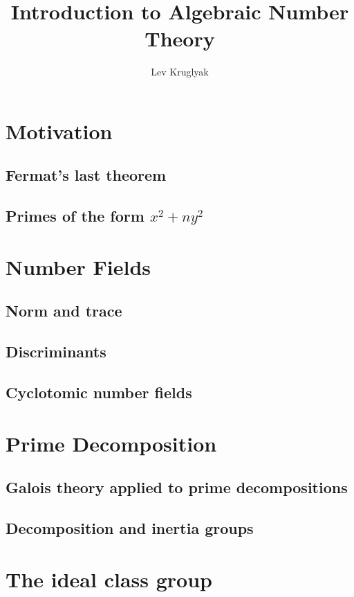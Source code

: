 \documentclass[11pt,letterpaper]{article}
\title{\textbf{Introduction to Algebraic Number Theory}}
\author{Lev Kruglyak}
\date{}
\begin{document}
\maketitle

\tableofcontents

\section{Motivation}
\subsection{Fermat's last theorem}
\subsection{Primes of the form $x^2+ny^2$}

\section{Number Fields}
\subsection{Norm and trace}
\subsection{Discriminants}
\subsection{Cyclotomic number fields}

\section{Prime Decomposition}
\subsection{Galois theory applied to prime decompositions}
\subsection{Decomposition and inertia groups}

\section{The ideal class group}
\end{document}
